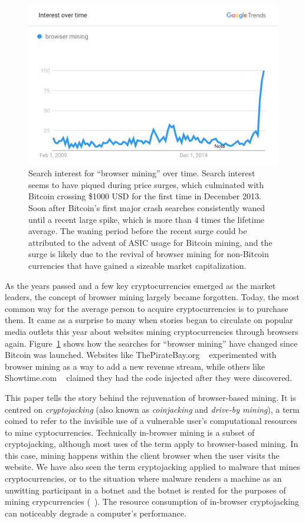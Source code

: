 \begin{figure}[t]
\centering
\includegraphics[width=0.9\linewidth]{figures/browser_mining.png}
\caption{Search interest for ``browser mining'' over time. Search interest seems to have piqued during price surges, which culminated with Bitcoin crossing \$1000 USD for the first time in December 2013. Soon after Bitcoin's first major crash searches consistently waned until a recent large spike, which is more than 4 times the lifetime average. The waning period before the recent surge could be attributed to the advent of ASIC usage for Bitcoin mining, and the surge is likely due to the revival of browser mining for non-Bitcoin currencies that have gained a sizeable market capitalization.\label{fig:interest}}
\end{figure}

As the years passed and a few key cryptocurrencies emerged as the market leaders, the concept of browser mining largely became forgotten. Today, the most common way for the average person to acquire cryptocurrencies is to purchase them. It came as a surprise to many when stories began to circulate on popular media outlets this year about websites mining cryptocurrencies through browsers again. Figure~\ref{fig:interest} shows how the searches for ``browser mining'' have changed since Bitcoin was launched. Websites like ThePirateBay.org ~\cite{piratesbayhive} experimented with browser mining as a way to add a new revenue stream, while others like Showtime.com ~\cite{showtimehive} claimed they had the code injected after they were discovered. 

This paper tells the story behind the rejuvenation of browser-based mining. It is centred on \textit{cryptojacking} (also known as \textit{coinjacking} and \textit{drive-by mining}), a term coined to refer to the invisible use of a vulnerable user's computational resources to mine cyptocurrencies. Technically in-browser mining is a subset of cryptojacking, although most uses of the term apply to browser-based mining. In this case, mining happens within the client browser when the user visits the website. We have also seen the term cryptojacking applied to malware that mines cryptocurrencies, or to the situation where malware renders a machine as an unwitting participant in a botnet and the botnet is rented for the purposes of mining crypcurrencies (\cf~\cite{huang2014botcoin}). The resource consumption of in-browser cryptojacking can noticeably degrade a computer's performance.

